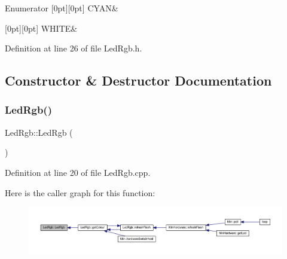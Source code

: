 \begin{DoxyEnumFields}{Enumerator}
[0pt][0pt]{}\mbox{\label{class_led_rgb_af328c665510f921f0dfed643f939087ba1718c136915fce13ae47066acbe861ad}} 
C\+Y\+AN&\\
\hline

[0pt][0pt]{}\mbox{\label{class_led_rgb_af328c665510f921f0dfed643f939087ba00db6e86f434a54a72f54a0efab84aff}} 
W\+H\+I\+TE&\\
\hline

\end{DoxyEnumFields}


Definition at line 26 of file Led\+Rgb.\+h.



\subsection{Constructor \& Destructor Documentation}
\mbox{\label{class_led_rgb_a6393b6af61bd195db3591d4e90a2b6e2}} 
\subsubsection{\texorpdfstring{Led\+Rgb()}{LedRgb()}}
{\footnotesize\ttfamily Led\+Rgb\+::\+Led\+Rgb (\begin{DoxyParamCaption}{ }\end{DoxyParamCaption})}



Definition at line 20 of file Led\+Rgb.\+cpp.

Here is the caller graph for this function\+:
\nopagebreak
\begin{figure}[H]
\begin{center}
\leavevmode
\includegraphics[width=350pt]{dc/d6d/class_led_rgb_a6393b6af61bd195db3591d4e90a2b6e2_icgraph}
\end{center}
\end{figure}
\mbox{\label{class_led_rgb_a4fac00de3a6801fd9da322eab7e04765}} 
